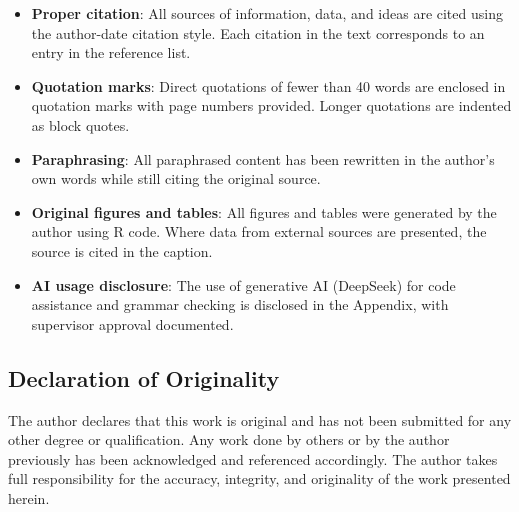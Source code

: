 \begin{itemize}
	\item \textbf{Proper citation}: All sources of information, data, and ideas are cited using the author-date citation style. Each citation in the text corresponds to an entry in the reference list.
	
	\item \textbf{Quotation marks}: Direct quotations of fewer than 40 words are enclosed in quotation marks with page numbers provided. Longer quotations are indented as block quotes.
	
	\item \textbf{Paraphrasing}: All paraphrased content has been rewritten in the author's own words while still citing the original source.
	
	\item \textbf{Original figures and tables}: All figures and tables were generated by the author using R code. Where data from external sources are presented, the source is cited in the caption.
	
	\item \textbf{AI usage disclosure}: The use of generative AI (DeepSeek) for code assistance and grammar checking is disclosed in the Appendix, with supervisor approval documented.
\end{itemize}

\subsection{Declaration of Originality}

The author declares that this work is original and has not been submitted for any other degree or qualification. Any work done by others or by the author previously has been acknowledged and referenced accordingly. The author takes full responsibility for the accuracy, integrity, and originality of the work presented herein.